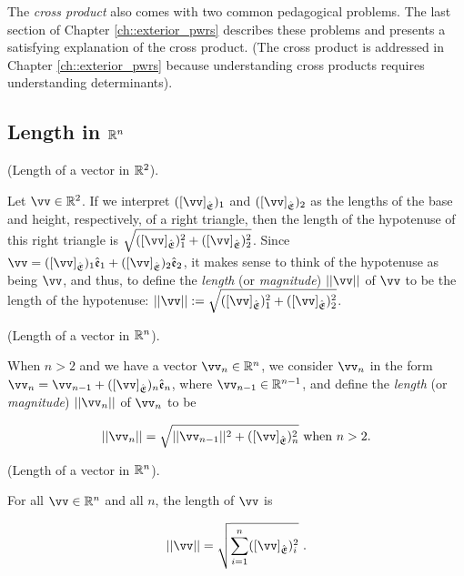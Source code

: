 \vspace{.5cm}

The \textit{cross product} also comes with two common pedagogical problems. The last section of Chapter \ref{ch::exterior_pwrs} describes these problems and presents a satisfying explanation of the cross product. (The cross product is addressed in Chapter \ref{ch::exterior_pwrs} because understanding cross products requires understanding determinants).

\newpage

\subsection*{Length in $\mathbb{R}^n$}
\label{ch::lin_alg::subsection::mag_and_angle_Rn}

\begin{defn}
\label{ch::lin_alg::defn::length_in_R2}
    (Length of a vector in $\mathbb{R}^2$).

    Let $\vv \in \R^2$. If we interpret $([\vv]_\sE)_1$ and $([\vv]_\sE)_2$ as the lengths of the base and height, respectively, of a right triangle, then the length of the hypotenuse of this right triangle is $\sqrt{([\vv]_\sE)_1^2 + ([\vv]_\sE)_2^2}$. Since $\vv = ([\vv]_\sE)_1 \see_1 + ([\vv]_\sE)_2 \see_2$, it makes sense to think of the hypotenuse as being $\vv$, and thus, to define the \textit{length} (or \textit{magnitude}) $||\vv||$ of $\vv$ to be the length of the hypotenuse: $||\vv|| := \sqrt{([\vv]_\sE)_1^2 + ([\vv]_\sE)_2^2}$.
\end{defn}

\begin{defn}
\label{ch::lin_alg::defn::length_in_Rn}
    (Length of a vector in $\mathbb{R}^n$). 

    When $n > 2$ and we have a vector $\vv_n \in \R^n$, we consider $\vv_n$ in the form $\vv_n = \vv_{n - 1} + ([\vv]_\sE)_n \see_n$, where $\vv_{n - 1} \in \R^{n - 1}$, and define the \textit{length} (or \textit{magnitude}) $||\vv_n||$ of $\vv_n$ to be

    \begin{align*}
        ||\vv_n|| = \sqrt{||\vv_{n - 1}||^2 + ([\vv]_\sE)_n^2} \text{ when $n > 2$}.
    \end{align*}
\end{defn}

\begin{theorem}
    (Length of a vector in $\mathbb{R}^n$).

    For all $\vv \in \R^n$ and all $n$, the length of $\vv$ is

    \begin{align*}
        ||\vv|| = \sqrt{\sum_{i = 1}^n ([\vv]_\sE)_i^2}\spc.
    \end{align*}
\end{theorem}

